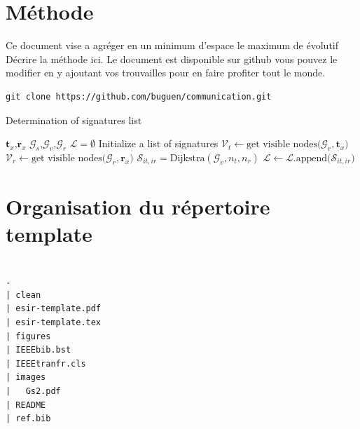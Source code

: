 \documentclass[twocolumn,a4paper]{IEEEtranfr}
\newcommand{\mc}[1]{\mathcal{#1}}
\begin{document}
\section{Méthode}

Ce document vise a agréger en un minimum d'espace le maximum de évolutif Décrire la méthode ici.
Le document est disponible sur github vous pouvez le modifier en y ajoutant
vos trouvailles pour en faire profiter tout le monde.

\begin{lstlisting}
git clone https://github.com/buguen/communication.git
\end{lstlisting}

\begin{algorithm}                      %
\label{alg1}                           %
\caption{Determination of signatures list}
\begin{algorithmic}                    %
\REQUIRE $\mathbf{t}_x$,$\mathbf{r}_x$
\REQUIRE $\mc{G}_s$,$\mc{G}_v$,$\mc{G}_r$
\STATE $\mathcal{L} = \emptyset $ Initialize a list of signatures
\STATE $\mathcal{V}_t \leftarrow \textrm{get visible nodes(}\mc{G}_r,\mathbf{t}_x\textrm{)}$
\STATE $\mathcal{V}_r \leftarrow \textrm{get visible nodes(}\mc{G}_r,\mathbf{r}_x\textrm{)}$
\STATE $\mc{S}_{it,ir}  = \textrm{Dijkstra}(\mc{G}_v,n_t,n_r)$
\STATE $\mathcal{L}\leftarrow \mathcal{L}.\textrm{append(}\mc{S}_{it,ir}\textrm{)}$
\ENDFOR
\ENDFOR
\end{algorithmic}
\end{algorithm}
\section{Organisation du répertoire template}

\begin{verbatim}

.
| clean
| esir-template.pdf
| esir-template.tex
| figures
| IEEEbib.bst
| IEEEtranfr.cls
| images
|   Gs2.pdf
| README
| ref.bib

\end{verbatim}

\end{document}
